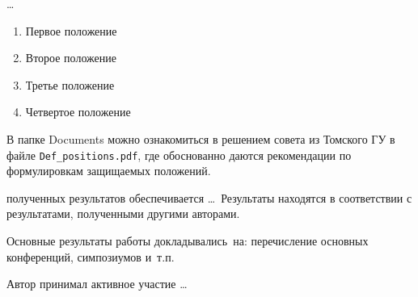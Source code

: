 {\methods} \ldots

{}
\begin{enumerate}
  \item Первое положение
  \item Второе положение
  \item Третье положение
  \item Четвертое положение
\end{enumerate}
В папке Documents можно ознакомиться в решением совета из Томского ГУ
в файле \verb+Def_positions.pdf+, где обоснованно даются рекомендации
по формулировкам защищаемых положений. 

{\reliability} полученных результатов обеспечивается \ldots \ Результаты находятся в соответствии с результатами, полученными другими авторами.


{\probation}
Основные результаты работы докладывались~на:
перечисление основных конференций, симпозиумов и~т.\:п.

{\contribution} Автор принимал активное участие \ldots


